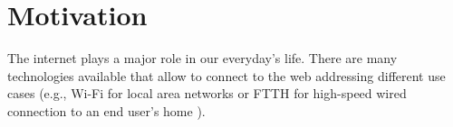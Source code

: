\section{Motivation} \label{sec:motivation}

%
%

The internet plays a major role in our everyday's life. There are many technologies available that allow to connect to the web addressing different use cases (e.g., Wi-Fi for local area networks \cite{Henry2002} or \ac{FTTH} for high-speed wired connection to an end user's home \cite{Aleksic2010}).

